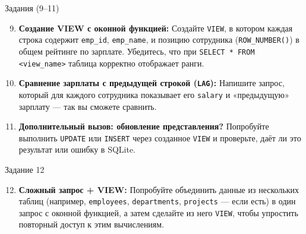 \documentclass{beamer}
\begin{document}
\begin{frame}{Задания (9--11)}
	\begin{enumerate}
		\setcounter{enumi}{8}
		\item \textbf{Создание VIEW с оконной функцией:}
		      Создайте \texttt{VIEW}, в котором каждая строка содержит \texttt{emp\_id}, \texttt{emp\_name},
		      и позицию сотрудника (\texttt{ROW\_NUMBER()}) в общем рейтинге по зарплате.
		      Убедитесь, что при \texttt{SELECT * FROM <view\_name>} таблица корректно отображает ранги.

		\item \textbf{Сравнение зарплаты с предыдущей строкой (\texttt{LAG}):}
		      Напишите запрос, который для каждого сотрудника показывает его \texttt{salary} и «предыдущую» зарплату — так вы сможете сравнить.

		\item \textbf{Дополнительный вызов: обновление представления?}
		      Попробуйте выполнить \texttt{UPDATE} или \texttt{INSERT} через созданное \texttt{VIEW} и проверьте, даёт ли это результат или ошибку в SQLite.
	\end{enumerate}
\end{frame}

\begin{frame}{Задание 12}
	\begin{enumerate}
		\setcounter{enumi}{11}
		\item \textbf{Сложный запрос + VIEW:}
		      Попробуйте объединить данные из нескольких таблиц (например, \texttt{employees}, \texttt{departments}, \texttt{projects} — если есть)
		      в один запрос с оконной функцией, а затем сделайте из него \texttt{VIEW}, чтобы упростить повторный доступ к этим вычислениям.
	\end{enumerate}
\end{frame}
\end{document}
